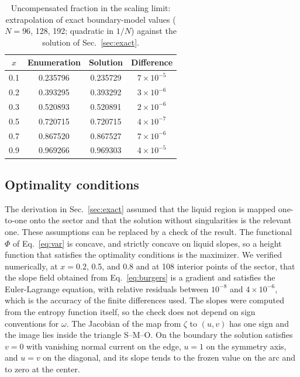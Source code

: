 \documentclass[reprint,aps,pre,superscriptaddress,longbibliography,floatfix,amsmath,amssymb]{revtex4-2}
\begin{document}
\begin{table}[b]
\caption{Uncompensated fraction in the scaling limit: extrapolation of exact boundary-model values ($N=96$, 128, 192; quadratic in $1/N$) against the solution of Sec.~\ref{sec:exact}.}
\label{tab:check}
\begin{ruledtabular}
\begin{tabular}{cccc}
$x$ & Enumeration & Solution & Difference\\ \hline
0.1 & 0.235796 & 0.235729 & $7\times10^{-5}$\\
0.2 & 0.393295 & 0.393292 & $3\times10^{-6}$\\
0.3 & 0.520893 & 0.520891 & $2\times10^{-6}$\\
0.5 & 0.720715 & 0.720715 & $4\times10^{-7}$\\
0.7 & 0.867520 & 0.867527 & $7\times10^{-6}$\\
0.9 & 0.969266 & 0.969303 & $4\times10^{-5}$\\
\end{tabular}
\end{ruledtabular}
\end{table}

\subsection{Optimality conditions}

The derivation in Sec.~\ref{sec:exact} assumed that the liquid region is mapped one-to-one onto the sector and that the solution without singularities is the relevant one. These assumptions can be replaced by a check of the result. The functional $\Phi$ of Eq.~\eqref{eq:var} is concave, and strictly concave on liquid slopes, so a height function that satisfies the optimality conditions is the maximizer. We verified numerically, at $x=0.2$, 0.5, and 0.8 and at 108 interior points of the sector, that the slope field obtained from Eq.~\eqref{eq:burgers} is a gradient and satisfies the Euler-Lagrange equation, with relative residuals between $10^{-8}$ and $4\times10^{-6}$, which is the accuracy of the finite differences used. The slopes were computed from the entropy function itself, so the check does not depend on sign conventions for $\omega$. The Jacobian of the map from $\zeta$ to $(u,v)$ has one sign and the image lies inside the triangle S--M--O. On the boundary the solution satisfies $v=0$ with vanishing normal current on the edge, $u=1$ on the symmetry axis, and $u=v$ on the diagonal, and its slope tends to the frozen value on the arc and to zero at the center.
\end{document}
